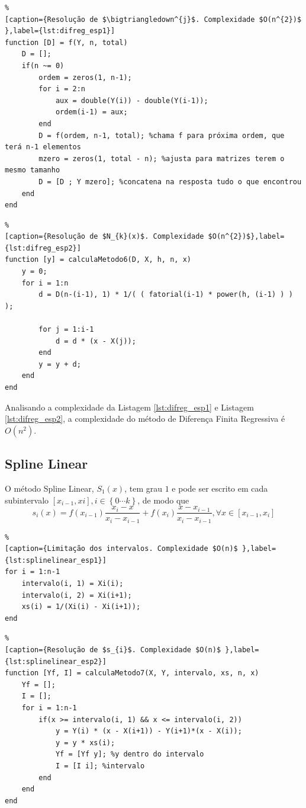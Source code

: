 \documentclass[conference]{IEEEtran}
\begin{document}
\begin{lstlisting}%
[caption={Resolução de $\bigtriangledown^{j}$. Complexidade $O(n^{2})$ },label={lst:difreg_esp1}]
function [D] = f(Y, n, total)
    D = [];
    if(n ~= 0)
        ordem = zeros(1, n-1);
        for i = 2:n
            aux = double(Y(i)) - double(Y(i-1));
            ordem(i-1) = aux;
        end
        D = f(ordem, n-1, total); %chama f para próxima ordem, que terá n-1 elementos
        mzero = zeros(1, total - n); %ajusta para matrizes terem o mesmo tamanho
        D = [D ; Y mzero]; %concatena na resposta tudo o que encontrou
    end
end
\end{lstlisting}

\begin{lstlisting}%
[caption={Resolução de $N_{k}(x)$. Complexidade $O(n^{2})$},label={lst:difreg_esp2}]
function [y] = calculaMetodo6(D, X, h, n, x)
    y = 0;
    for i = 1:n
        d = D(n-(i-1), 1) * 1/( ( fatorial(i-1) * power(h, (i-1) ) ) );

        for j = 1:i-1
            d = d * (x - X(j));
        end
        y = y + d;
    end
end
\end{lstlisting}
Analisando a complexidade da Listagem \ref{lst:difreg_esp1} e Listagem \ref{lst:difreg_esp2}, a complexidade do método de Diferença Finita Regressiva é $O(n^{2})$.

\subsection{Spline Linear} \label{subsec:splinelinear}
O método Spline Linear, $S_{1}(x)$, tem grau $1$ e pode ser escrito em cada subintervalo $[x_{i-1}, x{i}], i \in \left \{ 0 \cdots k  \right \} $, de modo que
$$
s_{i}(x)=f(x_{i-1})\frac{x_i-x}{x_i-x_{i-1}}+f(x_{i})\frac{x-x_{i-1}}{x_i-x_{i-1}}, \forall x \in [x_{i-1},x_{i}]
$$

\begin{lstlisting}%
[caption={Limitação dos intervalos. Complexidade $O(n)$ },label={lst:splinelinear_esp1}]
for i = 1:n-1
    intervalo(i, 1) = Xi(i);
    intervalo(i, 2) = Xi(i+1);
    xs(i) = 1/(Xi(i) - Xi(i+1));
end
\end{lstlisting}

\begin{lstlisting}%
[caption={Resolução de $s_{i}$. Complexidade $O(n)$ },label={lst:splinelinear_esp2}]
function [Yf, I] = calculaMetodo7(X, Y, intervalo, xs, n, x)
    Yf = [];
    I = [];
    for i = 1:n-1
        if(x >= intervalo(i, 1) && x <= intervalo(i, 2))
            y = Y(i) * (x - X(i+1)) - Y(i+1)*(x - X(i));
            y = y * xs(i);
            Yf = [Yf y]; %y dentro do intervalo
            I = [I i]; %intervalo
        end
    end
end
\end{lstlisting}
\end{document}
